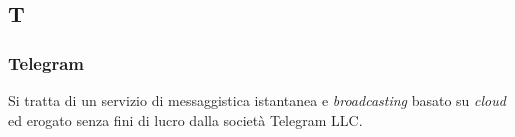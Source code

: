 \subsection{T}

\subsubsection{Telegram}
Si tratta di un servizio di messaggistica istantanea e \textit{broadcasting} basato su \textit{cloud} ed erogato senza fini di lucro dalla società Telegram LLC.